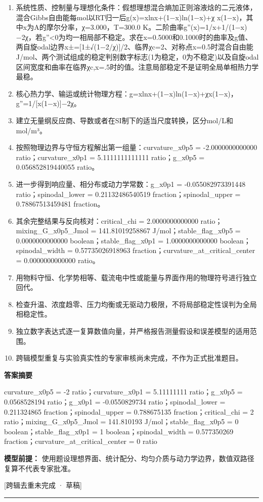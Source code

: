 \documentclass[UTF8,11pt,a4paper]{ctexart}
\begin{document}
\begin{enumerate}
\item 系统性质、控制量与理想化条件：假想理想混合熵加正则溶液焓的二元液体，混合Gibbs自由能每mol以RT归一后g(x)=xlnx+(1−x)ln(1−x)+χ x(1−x)，其中x为A的摩尔分率，χ=3.000，T=300.0 K。二阶曲率g''(x)=1/x+1/(1−x)−2χ，若g''<0为均一相局部不稳定。求在x=0.5000和0.1000时的曲率及g值、两自旋odal边界x±=[1±√(1−2/χ)]/2、临界χc=2、对称点x=0.5时混合自由能J/mol、两个测试组成的稳定判别数字标志(1为稳定，0为不稳定)以及自旋odal区间宽度和曲率在临界χc,x=.5时的值。注意局部稳定不是证明全局单相热力学最稳。
\item 核心热力学、输运或统计物理方程：g=xlnx+(1−x)ln(1−x)+χx(1−x)，g''=1/[x(1−x)]−2χ。
\item 建立无量纲反应商、导数或者在SI制下的适当尺度转换，区分mol/L和mol/m³。
\item 按照物理边界与守恒方程解出第一组量：curvature\_x0p5 = -2.0000000000000 ratio；curvature\_x0p1 = 5.1111111111111 ratio；g\_x0p5 = 0.056852819440055 ratio。
\item 进一步得到响应量、相分布或动力学常数：g\_x0p1 = -0.055082973391448 ratio；spinodal\_lower = 0.21132486540519 fraction；spinodal\_upper = 0.78867513459481 fraction。
\item 其余完整结果与反向核对：critical\_chi = 2.0000000000000 ratio；mixing\_G\_x0p5\_Jmol = 141.81019258867 J/mol；stable\_flag\_x0p5 = 0.0000000000000 boolean；stable\_flag\_x0p1 = 1.0000000000000 boolean；spinodal\_width = 0.57735026918963 fraction；curvature\_at\_critical\_center = 0.0000000000000 ratio。
\item 用物料守恒、化学势相等、载流电中性或能量与界面作用的物理符号进行独立回代。
\item 检查升温、浓度趋零、压力均衡或无驱动力极限，不将局部稳定性误判为全局相稳定性。
\item 独立数字表达式逐一复算数值向量，并严格报告测量假设和误差模型的适用范围。
\item 跨辑模型重复与实验真实性的专家审核尚未完成，不作为正式批准题目。
\end{enumerate}
\noindent\textbf{答案摘要}\par
curvature\_x0p5 = -2 ratio；curvature\_x0p1 = 5.11111111 ratio；g\_x0p5 = 0.0568528194 ratio；g\_x0p1 = -0.0550829734 ratio；spinodal\_lower = 0.211324865 fraction；spinodal\_upper = 0.788675135 fraction；critical\_chi = 2 ratio；mixing\_G\_x0p5\_Jmol = 141.810193 J/mol；stable\_flag\_x0p5 = 0 boolean；stable\_flag\_x0p1 = 1 boolean；spinodal\_width = 0.577350269 fraction；curvature\_at\_critical\_center = 0 ratio\par
\noindent\textbf{模型前提：}
使用题设理想界面、统计配分、均匀介质与动力学边界，数值双路径复算不代表专家批准。\par
\noindent\textcolor{red!65!black}{[跨辑去重未完成 · 草稿]} \par
\medskip\hrule\medskip
{}
\end{document}
